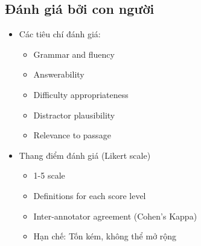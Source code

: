 \subsection{Đánh giá bởi con người}
\begin{itemize}
    \item Các tiêu chí đánh giá:
    \begin{itemize}
        \item Grammar and fluency
        \item Answerability
        \item Difficulty appropriateness
        \item Distractor plausibility
    \end{itemize}
    \begin{itemize}
        \item Relevance to passage
    \end{itemize}
    \item Thang điểm đánh giá (Likert scale)
    \begin{itemize}
        \item 1-5 scale
        \item Definitions for each score level
    \end{itemize}
    \begin{itemize}
        \item Inter-annotator agreement (Cohen's Kappa)
    \end{itemize}
    \begin{itemize}
        \item Hạn chế: Tốn kém, không thể mở rộng
    \end{itemize}
\end{itemize}

